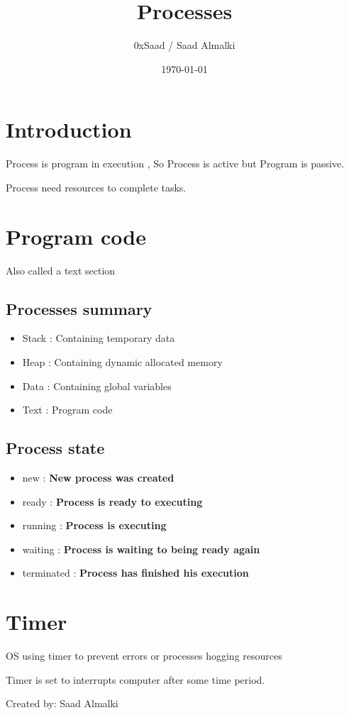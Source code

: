 \documentclass[12pt]{article}
\title{Processes}
\author{0xSaad / Saad Almalki}
\date{\today}
\begin{document}
\maketitle

\section{Introduction}
Process is program in execution , So Process is active but Program is passive.

Process need resources to complete tasks.

\section{Program code}
Also called a text section 

\subsection{Processes summary}
\begin{itemize}
    \item Stack : Containing temporary data
    \item Heap : Containing dynamic allocated memory
    \item Data : Containing global variables
    \item Text : Program code
\end{itemize}

\subsection{Process state}
\begin{itemize}
    \item new : \textbf{New process was created}
    \item ready : \textbf{Process is ready to executing}
    \item running : \textbf{Process is executing}
    \item waiting : \textbf{Process is waiting to being ready again}
    \item terminated : \textbf{Process has finished his execution}
\end{itemize}

\section{Timer}
OS using timer to prevent errors or processes hogging resources

Timer is set to interrupts computer after some time period.


\begin{flushright}
Created by: Saad Almalki \\
\end{flushright}
\end{document}
